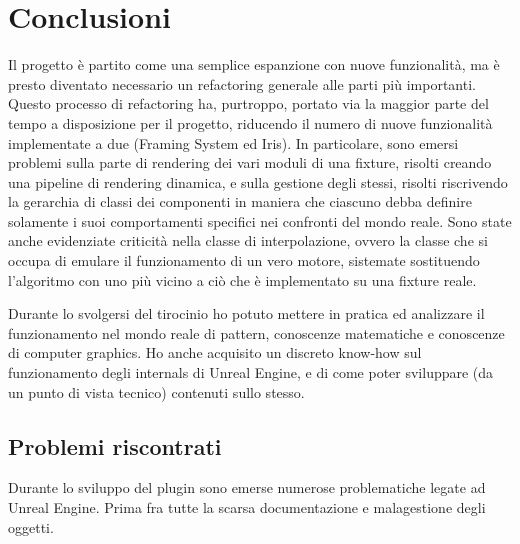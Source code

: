 \documentclass[main.tex]{subfiles}
\begin{document}
\sloppy


\vspace{1.0cm}

\section{Conclusioni}\label{sec:End}
Il progetto è partito come una semplice espanzione con nuove funzionalità, ma è presto diventato necessario un refactoring generale alle parti più importanti. Questo processo di refactoring ha, purtroppo, portato via la maggior parte del tempo a disposizione per il progetto, riducendo il numero di nuove funzionalità implementate a due (Framing System ed Iris). In particolare, sono emersi problemi sulla parte di rendering dei vari moduli di una fixture, risolti creando una pipeline di rendering dinamica, e sulla gestione degli stessi, risolti riscrivendo la gerarchia di classi dei componenti in maniera che ciascuno debba definire solamente i suoi comportamenti specifici nei confronti del mondo reale. Sono state anche evidenziate criticità nella classe di interpolazione, ovvero la classe che si occupa di emulare il funzionamento di un vero motore, sistemate sostituendo l'algoritmo con uno più vicino a ciò che è implementato su una fixture reale.

Durante lo svolgersi del tirocinio ho potuto mettere in pratica ed analizzare il funzionamento nel mondo reale di pattern, conoscenze matematiche e conoscenze di computer graphics. Ho anche acquisito un discreto know-how sul funzionamento degli internals di Unreal Engine, e di come poter sviluppare (da un punto di vista tecnico) contenuti sullo stesso. 

\subsection{Problemi riscontrati}\label{subsec:6_Problems}
Durante lo sviluppo del plugin sono emerse numerose problematiche legate ad Unreal Engine. Prima fra tutte la scarsa documentazione e malagestione degli oggetti.\newline
\end{document}
